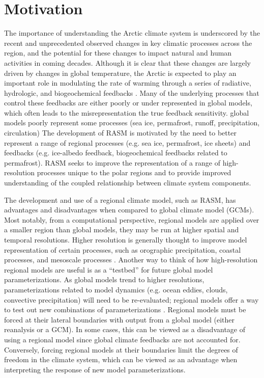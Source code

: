 \section{Motivation}

The importance of understanding the Arctic climate system is underscored by the recent and unprecedented observed changes in key climatic processes across the region, and the potential for these changes to impact natural and human activities in coming decades.
Although it is clear that these changes are largely driven by changes in global temperature, the Arctic is expected to play an important role in modulating the rate of warming through a series of radiative, hydrologic, and biogeochemical feedbacks  \citep{Holland_2003}.
Many of the underlying processes that control these feedbacks are either poorly or under represented in global models, which often leads to the misrepresentation the true feedback sensitivity.
global models poorly represent some processes (sea ice, permafrost, runoff, precipitation, circulation)
The development of RASM is motivated by the need to better represent a range of regional processes (e.g. sea ice, permafrost, ice sheets) and feedbacks (e.g. ice-albedo feedback, biogeochemical feedbacks related to permafrost).
RASM seeks to improve the representation of a range of high-resolution processes unique to the polar regions and to provide improved understanding of the coupled relationship between climate system components.

The development and use of a regional climate model, such as RASM, has advantages and disadvantages when compared to global climate model (GCMs).
Most notably, from a computational perspective, regional models are applied over a smaller region than global models, they may be run at higher spatial and temporal resolutions.
Higher resolution is generally thought to improve model representation of certain processes, such as orographic precipitation, coastal processes, and mesoscale processes \citep{Feser_2011}.
Another way to think of how high-resolution regional models are useful is as a ``testbed'' for future global model parameterizations.
As global models trend to higher resolutions, parameterizations related to model dynamics (e.g. ocean eddies, clouds, convective precipitation) will need to be re-evaluated; regional models offer a way to test out new combinations of parameterizations \citep[e.g. ][]{Roberts_2015a,Cassano_2016}.
Regional models must be forced at their lateral boundaries with output from a global model (either reanalysis or a GCM).
In some cases, this can be viewed as a disadvantage of using a regional model since global climate feedbacks are not accounted for.
Conversely, forcing regional models at their boundaries limit the degrees of freedom in the climate system, which can be viewed as an advantage when interpreting the response of new model parameterizations.

